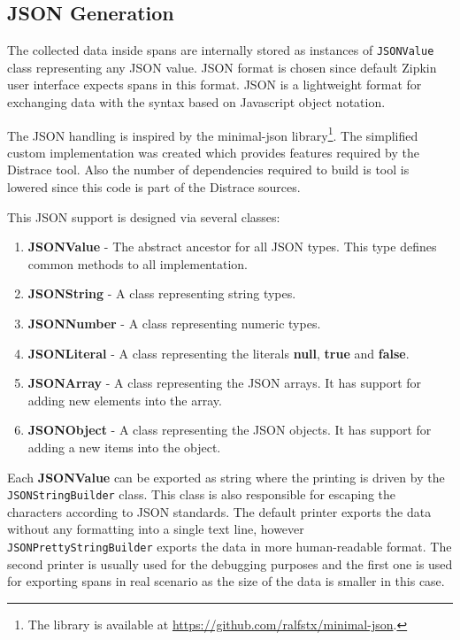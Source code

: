 \subsection{JSON Generation}
\label{json_gen}

The collected data inside spans are internally stored as instances of \texttt{JSONValue} class representing any JSON value. JSON format is chosen since default Zipkin user interface expects spans in this format. JSON is a lightweight format for exchanging data with the syntax based on Javascript object notation.

The JSON handling is inspired by the minimal-json library\footnote{The library is available at \url{https://github.com/ralfstx/minimal-json}.}. The simplified custom implementation was created which provides features required by the Distrace tool. Also the number of dependencies required to build is tool is lowered since this code is part of the Distrace sources.

This JSON support is designed via several classes:
\begin{enumerate}
	\item \textbf{JSONValue} - The abstract ancestor for all JSON types. This type defines common methods to all implementation.
	\item \textbf{JSONString} - A class representing string types.
	\item \textbf{JSONNumber} - A class representing numeric types.
	\item \textbf{JSONLiteral} - A class representing the literals \textbf{null}, \textbf{true} and \textbf{false}.
	\item \textbf{JSONArray} - A class representing the JSON arrays. It has support for adding new elements into the array.
	\item \textbf{JSONObject} - A class representing the JSON objects. It has support for adding a new items into the object.
\end{enumerate}

Each \textbf{JSONValue} can be exported as string where the printing is driven by the \texttt{JSONStringBuilder} class. This class is also responsible for escaping the characters according to JSON standards. The default printer exports the data without any formatting into a single text line, however \texttt{JSONPrettyStringBuilder} exports the data in more human-readable format. The second printer is usually used for the debugging purposes and the first one is used for exporting spans in real scenario as the size of the data is smaller in this case.


